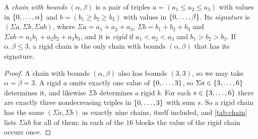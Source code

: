 \documentclass[11pt,a4paper]{article}
\begin{document}
\begin{lemma}\label{lem:chainsig}
A \emph{chain with bounds} $(\alpha,\beta)$ is a pair of triples $a=(a_1\le a_2\le a_3)$ with values in $\{0,\ldots,\alpha\}$ and $b=(b_1\ge b_2\ge b_3)$ with values in $\{0,\ldots,\beta\}$. Its \emph{signature} is $(\Sigma a,\Sigma b,\Sigma ab)$, where $\Sigma a=a_1+a_2+a_3$, $\Sigma b=b_1+b_2+b_3$ and $\Sigma ab=a_1b_1+a_2b_2+a_3b_3$, and it is \emph{rigid} if $a_1<a_2<a_3$ and $b_1>b_2>b_3$. If $\alpha,\beta\le3$, a rigid chain is the only chain with bounds $(\alpha,\beta)$ that has its signature.
\end{lemma}

\begin{proof}
A chain with bounds $(\alpha,\beta)$ also has bounds $(3,3)$, so we may take $\alpha=\beta=3$. A rigid $a$ omits exactly one value of $\{0,\ldots,3\}$, so $\Sigma a\in\{3,\ldots,6\}$ determines it, and likewise $\Sigma b$ determines a rigid $b$. For each $s\in\{3,\ldots,6\}$ there are exactly three nondecreasing triples in $\{0,\ldots,3\}$ with sum $s$. So a rigid chain has the same $(\Sigma a,\Sigma b)$ as exactly nine chains, itself included, and \cref{tab:chain} lists $\Sigma ab$ for all of them: in each of the $16$ blocks the value of the rigid chain occurs once.
\end{proof}
\end{document}
